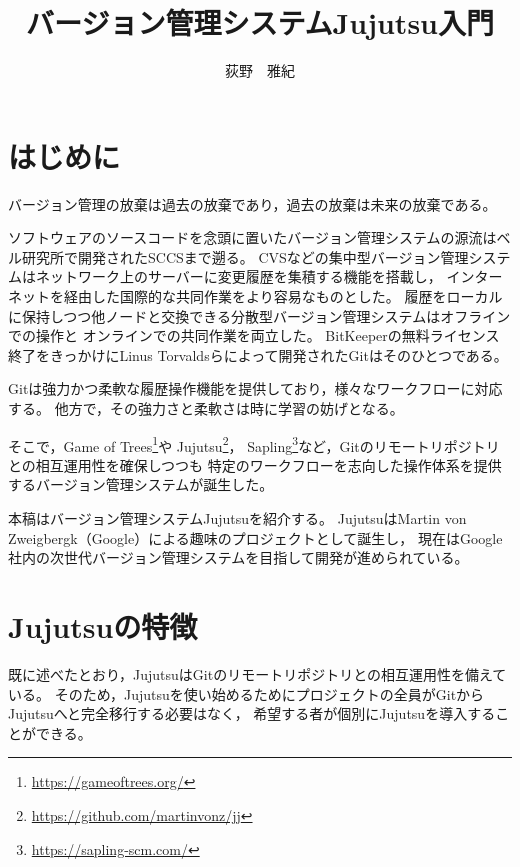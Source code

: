 \documentclass[b5j,twocolumn]{ltjsarticle}
\title{バージョン管理システムJujutsu入門}
\author{荻野　雅紀}
\date{}
\begin{document}
\pagestyle{empty}
\maketitle

\section{はじめに}

バージョン管理の放棄は過去の放棄であり，過去の放棄は未来の放棄である。

ソフトウェアのソースコードを念頭に置いたバージョン管理システムの源流はベル研究所で開発されたSCCSまで遡る。
CVSなどの集中型バージョン管理システムはネットワーク上のサーバーに変更履歴を集積する機能を搭載し，
インターネットを経由した国際的な共同作業をより容易なものとした。
履歴をローカルに保持しつつ他ノードと交換できる分散型バージョン管理システムはオフラインでの操作と
オンラインでの共同作業を両立した。
BitKeeperの無料ライセンス終了をきっかけにLinus Torvaldsらによって開発されたGitはそのひとつである。

Gitは強力かつ柔軟な履歴操作機能を提供しており，様々なワークフローに対応する。
他方で，その強力さと柔軟さは時に学習の妨げとなる。

そこで，Game of Trees\footnote{\url{https://gameoftrees.org/}}や
Jujutsu\footnote{\url{https://github.com/martinvonz/jj}}，
Sapling\footnote{\url{https://sapling-scm.com/}}など，Gitのリモートリポジトリとの相互運用性を確保しつつも
特定のワークフローを志向した操作体系を提供するバージョン管理システムが誕生した。

本稿はバージョン管理システムJujutsuを紹介する。
JujutsuはMartin von Zweigbergk（Google）による趣味のプロジェクトとして誕生し，
現在はGoogle社内の次世代バージョン管理システムを目指して開発が進められている。

\newpage

\section{Jujutsuの特徴}

既に述べたとおり，JujutsuはGitのリモートリポジトリとの相互運用性を備えている。
そのため，Jujutsuを使い始めるためにプロジェクトの全員がGitからJujutsuへと完全移行する必要はなく，
希望する者が個別にJujutsuを導入することができる。
\end{document}
